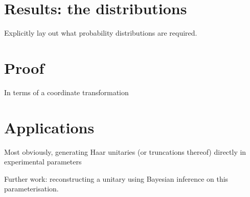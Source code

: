 \section{Results: the distributions}
Explicitly lay out what probability distributions are required.

\section{Proof}
In terms of a coordinate transformation

\section{Applications}
Most obviously, generating Haar unitaries (or truncations thereof) directly in
experimental parameters

Further work: reconstructing a unitary using Bayesian inference on this
parameterisation.
